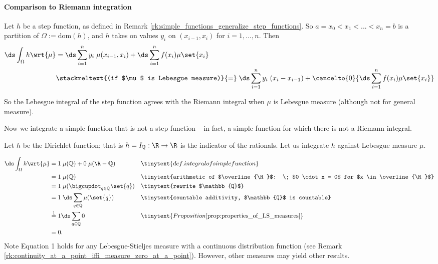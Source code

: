 \documentclass{article} %
\newif\ifActive
\renewcommand{\Q}{\mathbb{Q}}
\begin{document}
\paragraph{Comparison to Riemann integration}

\begin{example}{}
Let $h$ be a step function, as defined in Remark \ref{rk:simple_functions_generalize_step_functions}.   So  $a = x_0 < x_1 < ... < x_n = b$ is a partition of $\Omega := \text{dom}(h)$, and $h$ takes on values $y_i$ on $(x_{i-1},x_i)$ for $i=1,...,n$.  Then 
\begin{align*}
\ds\int_{\Omega} h \wrt{\mu} &= \ds\sum_{i=1}^n y_i \; \mu(x_{i-1},x_i) + \ds\sum_{i=1}^n f(x_i) \mu\set{x_i} \\
& \stackreltext{(if $\mu$ is Lebesgue measure)}{=} \; \ds\sum_{i=1}^n y_i \; (x_i - x_{i-1}) + \cancelto{0}{\ds\sum_{i=1}^n f(x_i) \mu\set{x_i}}
\end{align*}

So the Lebesgue integral of the step function agrees with the Riemann integral when $\mu$ is Lebesgue measure (although not for general measure).
\end{example}

Now we integrate a simple function that is not a step function -- in fact, a simple function for which there is not a Riemann integral. 

\begin{example}{}
Let $h$ be the Dirichlet function; that is $h = I_{\Q} : \R \to \R$ is the indicator of the rationals.  Let us integrate $h$ against Lebesgue measure $\mu$. 
%
\ifActive 
	\textbf{Workshop Exercise:} Derive the integral. 
\else 
	\begin{align*}
	\ds\int_{\Omega} h \wrt{\mu} &= 1 \; \mu(\Q) + 0 \; \mu(\R - \Q) && \tinytext{def. integral of simple function} \\
	 &= 1 \; \mu(\Q) && \tinytext{arithmetic of $\overline{\R}$: \; $0 \cdot x = 0$ for $x \in \overline{\R}$} \\
	 	&= 1 \; \mu(\bigcupdot_{q \in \Q} \set{q}) && \tinytext{rewrite $\Q$} \\
	&= 1 \; \ds\sum_{q \in \Q} \mu(\set{q}) && \tinytext{countable additivity, $\Q$ is countable} \\
	& \stackrel{1}{=} 1 \ds\sum_{q \in \Q} 0 && \tinytext{Proposition \ref{prop:properties_of_LS_measures}} \\
	&= 0.  
	\end{align*}
	Note Equation 1 holds for any Lebesgue-Stieljes measure with a continuous distribution function (see Remark \ref{rk:continuity_at_a_point_iffi_measure_zero_at_a_point}).  However, other measures may yield other results.
\fi 
\label{ex:integrating_the_dirichlet_function}
\end{example}
\end{document}
